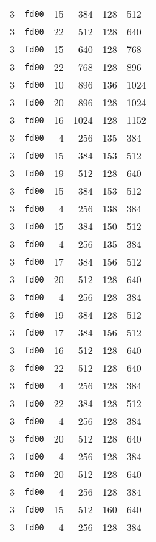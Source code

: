 \documentclass{article}
\begin{document}
\begin{table}[h!]
\begin{tabular}{llrrrl}
    3 & \texttt{fd00} & 15 & 384 & 128 & 512 \\
    3 & \texttt{fd00} & 22 & 512 & 128 & 640 \\
    3 & \texttt{fd00} & 15 & 640 & 128 & 768 \\
    3 & \texttt{fd00} & 22 & 768 & 128 & 896 \\
    3 & \texttt{fd00} & 10 & 896 & 136 & 1024 \\
    3 & \texttt{fd00} & 20 & 896 & 128 & 1024 \\
    3 & \texttt{fd00} & 16 & 1024 & 128 & 1152 \\
    3 & \texttt{fd00} & 4 & 256 & 135 & 384 \\
    3 & \texttt{fd00} & 15 & 384 & 153 & 512 \\
    3 & \texttt{fd00} & 19 & 512 & 128 & 640 \\
    3 & \texttt{fd00} & 15 & 384 & 153 & 512 \\
    3 & \texttt{fd00} & 4 & 256 & 138 & 384 \\
    3 & \texttt{fd00} & 15 & 384 & 150 & 512 \\
    3 & \texttt{fd00} & 4 & 256 & 135 & 384 \\
    3 & \texttt{fd00} & 17 & 384 & 156 & 512 \\
    3 & \texttt{fd00} & 20 & 512 & 128 & 640 \\
    3 & \texttt{fd00} & 4 & 256 & 128 & 384 \\
    3 & \texttt{fd00} & 19 & 384 & 128 & 512 \\
    3 & \texttt{fd00} & 17 & 384 & 156 & 512 \\
    3 & \texttt{fd00} & 16 & 512 & 128 & 640 \\
    3 & \texttt{fd00} & 22 & 512 & 128 & 640 \\
    3 & \texttt{fd00} & 4 & 256 & 128 & 384 \\
    3 & \texttt{fd00} & 22 & 384 & 128 & 512 \\
    3 & \texttt{fd00} & 4 & 256 & 128 & 384 \\
    3 & \texttt{fd00} & 20 & 512 & 128 & 640 \\
    3 & \texttt{fd00} & 4 & 256 & 128 & 384 \\
    3 & \texttt{fd00} & 20 & 512 & 128 & 640 \\
    3 & \texttt{fd00} & 4 & 256 & 128 & 384 \\
    3 & \texttt{fd00} & 15 & 512 & 160 & 640 \\
    3 & \texttt{fd00} & 4 & 256 & 128 & 384 \\

\end{tabular}
\end{table}
\end{document}

